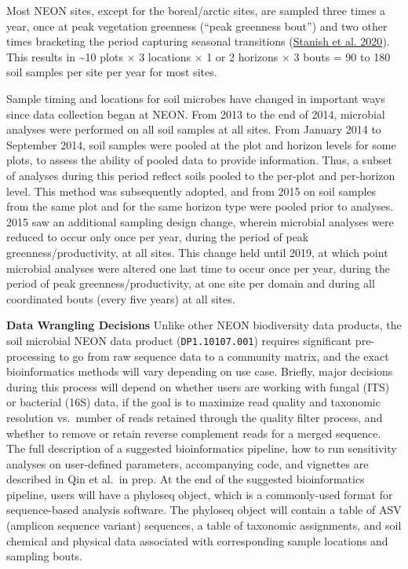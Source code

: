 \documentclass[
  12pt,
]{article}
\begin{document}
Most NEON sites, except for the boreal/arctic sites, are sampled three times a year, once at peak vegetation greenness (``peak greenness bout'') and two other times bracketing the period capturing seasonal transitions (\protect\hyperlink{ref-Stanish2020}{Stanish et al. 2020}). This results in \textasciitilde10 plots \(\times\) 3 locations \(\times\) 1 or 2 horizons \(\times\) 3 bouts = 90 to 180 soil samples per site per year for most sites.

Sample timing and locations for soil microbes have changed in important ways since data collection began at NEON. From 2013 to the end of 2014, microbial analyses were performed on all soil samples at all sites. From January 2014 to September 2014, soil samples were pooled at the plot and horizon levels for some plots, to assess the ability of pooled data to provide information. Thus, a subset of analyses during this period reflect soils pooled to the per‐plot and per‐horizon level. This method was subsequently adopted, and from 2015 on soil samples from the same plot and for the same horizon type were pooled prior to analyses. 2015 saw an additional sampling design change, wherein microbial analyses were reduced to occur only once per year, during the period of peak greenness/productivity, at all sites. This change held until 2019, at which point microbial analyses were altered one last time to occur once per year, during the period of peak greenness/productivity, at one site per domain and during all coordinated bouts (every five years) at all sites.

\textbf{Data Wrangling Decisions} Unlike other NEON biodiversity data products, the soil microbial NEON data product (\texttt{DP1.10107.001}) requires significant pre-processing to go from raw sequence data to a community matrix, and the exact bioinformatics methods will vary depending on use case. Briefly, major decisions during this process will depend on whether users are working with fungal (ITS) or bacterial (16S) data, if the goal is to maximize read quality and taxonomic resolution vs.~number of reads retained through the quality filter process, and whether to remove or retain reverse complement reads for a merged sequence. The full description of a suggested bioinformatics pipeline, how to run sensitivity analyses on user-defined parameters, accompanying code, and vignettes are described in Qin et al.~in prep. At the end of the suggested bioinformatics pipeline, users will have a phyloseq object, which is a commonly-used format for sequence-based analysis software. The phyloseq object will contain a table of ASV (amplicon sequence variant) sequences, a table of taxonomic assignments, and soil chemical and physical data associated with corresponding sample locations and sampling bouts.
\end{document}
